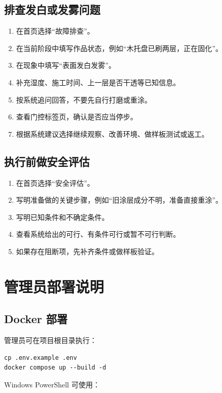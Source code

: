\documentclass[UTF8,a4paper,12pt]{ctexart}
\begin{document}
\subsection{排查发白或发雾问题}

\begin{enumerate}[leftmargin=2em]
  \item 在首页选择“故障排查”。
  \item 在当前阶段中填写作品状态，例如“木托盘已刷两层，正在固化”。
  \item 在现象中填写“表面发白发雾”。
  \item 补充湿度、施工时间、上一层是否干透等已知信息。
  \item 按系统追问回答，不要先自行打磨或重涂。
  \item 查看门控标签页，确认是否应当停步。
  \item 根据系统建议选择继续观察、改善环境、做样板测试或返工。
\end{enumerate}

\subsection{执行前做安全评估}

\begin{enumerate}[leftmargin=2em]
  \item 在首页选择“安全评估”。
  \item 写明准备做的关键步骤，例如“旧涂层成分不明，准备直接重涂”。
  \item 写明已知条件和不确定条件。
  \item 查看系统给出的可行、有条件可行或暂不可行判断。
  \item 如果存在阻断项，先补齐条件或做样板验证。
\end{enumerate}

\section{管理员部署说明}

\subsection{Docker 部署}

管理员可在项目根目录执行：

\begin{lstlisting}
cp .env.example .env
docker compose up --build -d
\end{lstlisting}

Windows PowerShell 可使用：
\end{document}
